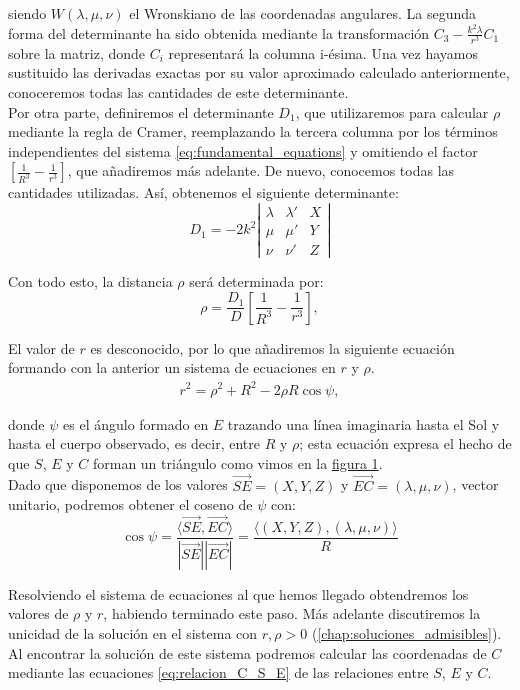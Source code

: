 \noindent siendo $W(\lambda,\mu,\nu)$ el Wronskiano de las coordenadas angulares. La segunda forma del determinante ha sido obtenida mediante la transformación $C_3-\frac{k^2\lambda}{r^3}C_1$ sobre la matriz, donde $C_i$ representará la columna i-ésima. Una vez hayamos sustituido las derivadas exactas por su valor aproximado calculado anteriormente, conoceremos todas las cantidades de este determinante.\\

Por otra parte, definiremos el determinante $D_1$, que utilizaremos para calcular $\rho$ mediante la regla de Cramer, reemplazando la tercera columna por los términos independientes del sistema \eqref{eq:fundamental_equations} y omitiendo el factor $[\frac{1}{R^3}-\frac{1}{r^3}]$, que añadiremos más adelante. De nuevo, conocemos todas las cantidades utilizadas. Así, obtenemos el siguiente determinante:
\[
D_1 = -2k^2
\left|
\begin{array}{ccc}
\lambda & \lambda' & X\\
\mu & \mu' & Y\\
\nu & \nu' & Z
\end{array}
\right|
\]

Con todo esto, la distancia $\rho$ será determinada por:
\[
\rho = \frac{D_1}{D}[\frac{1}{R^3}-\frac{1}{r^3}],
\]

El valor de $r$ es desconocido, por lo que añadiremos la siguiente ecuación formando con la anterior un sistema de ecuaciones en $r$ y $\rho$.
\begin{align}
r^2=\rho^2+R^2-2\rho R\cos\psi,
\label{eq:triangle_relations_1}
\end{align}

\noindent donde $\psi$ es el ángulo formado en $E$ trazando una línea imaginaria hasta el Sol y hasta el cuerpo observado, es decir, entre $R$ y $\rho$; esta ecuación expresa el hecho de que $S$, $E$ y $C$ forman un triángulo como vimos en la \hyperref[figure:1]{figura 1}.\\

Dado que disponemos de los valores $\overrightarrow{SE}=(X,Y,Z)$ y $\overrightarrow{EC}=(\lambda,\mu,\nu)$, vector unitario, podremos obtener el coseno de $\psi$ con:
\[
\cos{\psi}=\frac{\langle\overrightarrow{SE},\overrightarrow{EC}\rangle}{|\overrightarrow{SE}||\overrightarrow{EC}|}=\frac{\langle(X,Y,Z),(\lambda,\mu,\nu)\rangle}{R}
\]

Resolviendo el sistema de ecuaciones al que hemos llegado obtendremos los valores de $\rho$ y $r$, habiendo terminado este paso. Más adelante discutiremos la unicidad de la solución en el sistema con $r,\rho>0$ (\ref{chap:soluciones_admisibles}). Al encontrar la solución de este sistema podremos calcular las coordenadas de $C$ mediante las ecuaciones \eqref{eq:relacion_C_S_E} de las relaciones entre $S$, $E$ y $C$. \cite{moulton}\\



